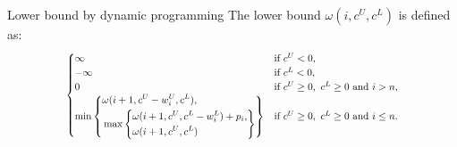 \documentclass[fleqn,11pt,aspectratio=43]{beamer}
\begin{document}
\begin{frame}{Lower bound by dynamic programming}
The lower bound $\omega(i, c^U, c^L)$ is defined as:
\[
\scalebox{0.8}{$
\begin{cases}
\infty &  \text{if } c^U < 0, \\
-\infty &  \text{if } c^L < 0, \\
0 &  \text{if } c^U \geq 0,\ c^L \geq 0 \text{ and } i > n, \\
\min \left\{
\begin{aligned}
&\omega(i + 1, c^U - w_i^U, c^L), \\
&\max \left\{
\begin{aligned}
&\omega(i + 1, c^U, c^L - w_i^L) + p_i, \\
&\omega(i + 1, c^U, c^L)
\end{aligned}
\right\}
\end{aligned}
\right\} & \text{if } c^U \geq 0,\ c^L \geq 0 \text{ and } i \leq n.
\end{cases}
$}
\]
\end{frame}
\end{document}
